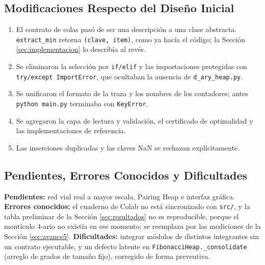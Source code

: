\subsection{Modificaciones Respecto del Diseño Inicial}
\begin{enumerate}
    \item El contrato de colas pasó de ser una descripción a una clase abstracta. \texttt{extract\_min} retorna \texttt{(clave, item)}, como ya hacía el código; la Sección \ref{sec:implementacion} lo describía al revés.
    \item Se eliminaron la selección por \texttt{if/elif} y las importaciones protegidas con \texttt{try/except ImportError}, que ocultaban la ausencia de \texttt{d\_ary\_heap.py}.
    \item Se unificaron el formato de la traza y los nombres de los contadores; antes \texttt{python main.py} terminaba con \texttt{KeyError}.
    \item Se agregaron la capa de lectura y validación, el certificado de optimalidad y las implementaciones de referencia.
    \item Las inserciones duplicadas y las claves NaN se rechazan explícitamente.
\end{enumerate}

\subsection{Pendientes, Errores Conocidos y Dificultades}
\textbf{Pendientes:} red vial real a mayor escala, Pairing Heap e interfaz gráfica. \textbf{Errores conocidos:} el cuaderno de Colab no está sincronizado con \texttt{src/}, y la tabla preliminar de la Sección \ref{sec:resultados} no es reproducible, porque el montículo 4-ario no existía en ese momento; se reemplaza por las mediciones de la Sección \ref{sec:avance5}. \textbf{Dificultades:} integrar módulos de distintos integrantes sin un contrato ejecutable, y un defecto latente en \texttt{FibonacciHeap.\_consolidate} (arreglo de grados de tamaño fijo), corregido de forma preventiva.
